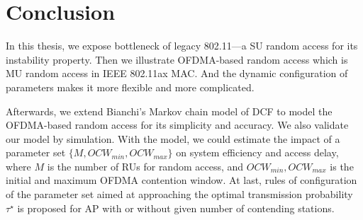 \chapter{Conclusion}   \label{chp_conclu}
In this thesis, we expose bottleneck of legacy 802.11---a SU random access for its instability property. 
Then we illustrate OFDMA-based random access which is MU random access in IEEE 802.11ax MAC. 
And the dynamic configuration of parameters makes it more flexible and more complicated. 

Afterwards, we extend Bianchi's Markov chain model of DCF to model the OFDMA-based random access for its simplicity and accuracy. We also validate our model by simulation. 
With the model, we could estimate the impact of a parameter set $\lbrace M, OCW_{min}, OCW_{max} \rbrace$ on system efficiency and access delay, where $M$ is the number of RUs for random access,  and $OCW_{min}, OCW_{max}$ is the initial and maximum OFDMA contention window. 
At last, rules of configuration of the parameter set aimed at approaching the optimal transmission probability $\tau^\star$ is proposed for AP with or without given number of contending stations.